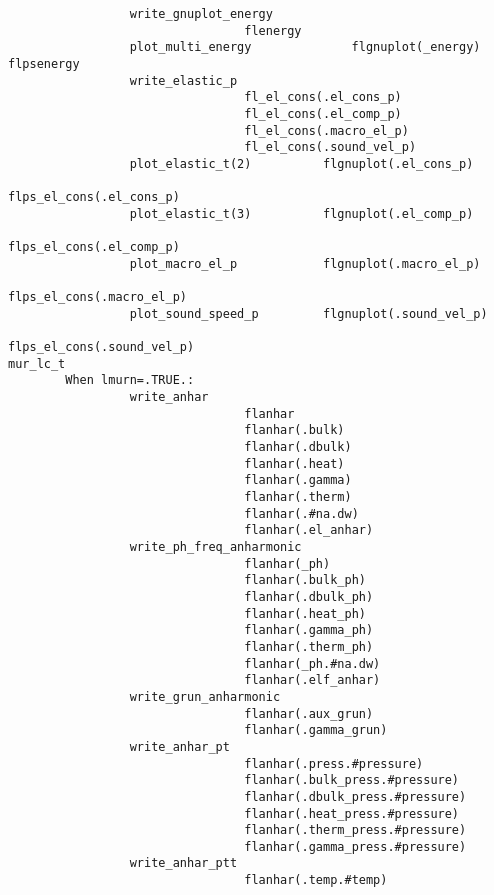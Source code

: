 \documentclass[12pt,a4paper,twoside]{report}
\begin{document}
\begin{footnotesize}
\begin{verbatim}
                 write_gnuplot_energy
                                 flenergy
                 plot_multi_energy              flgnuplot(_energy)  flpsenergy
                 write_elastic_p                
                                 fl_el_cons(.el_cons_p)              
                                 fl_el_cons(.el_comp_p)              
                                 fl_el_cons(.macro_el_p)              
                                 fl_el_cons(.sound_vel_p)              
                 plot_elastic_t(2)          flgnuplot(.el_cons_p)
                                                    flps_el_cons(.el_cons_p)
                 plot_elastic_t(3)          flgnuplot(.el_comp_p)
                                                    flps_el_cons(.el_comp_p)
                 plot_macro_el_p            flgnuplot(.macro_el_p)
                                                    flps_el_cons(.macro_el_p)
                 plot_sound_speed_p         flgnuplot(.sound_vel_p)
                                                    flps_el_cons(.sound_vel_p)
mur_lc_t        
        When lmurn=.TRUE.: 
                 write_anhar
                                 flanhar
                                 flanhar(.bulk)
                                 flanhar(.dbulk)
                                 flanhar(.heat)
                                 flanhar(.gamma)
                                 flanhar(.therm)
                                 flanhar(.#na.dw)
                                 flanhar(.el_anhar)
                 write_ph_freq_anharmonic
                                 flanhar(_ph)
                                 flanhar(.bulk_ph)
                                 flanhar(.dbulk_ph)
                                 flanhar(.heat_ph)
                                 flanhar(.gamma_ph)
                                 flanhar(.therm_ph)
                                 flanhar(_ph.#na.dw)
                                 flanhar(.elf_anhar)
                 write_grun_anharmonic
                                 flanhar(.aux_grun)
                                 flanhar(.gamma_grun)
                 write_anhar_pt
                                 flanhar(.press.#pressure)
                                 flanhar(.bulk_press.#pressure)
                                 flanhar(.dbulk_press.#pressure)
                                 flanhar(.heat_press.#pressure)
                                 flanhar(.therm_press.#pressure)
                                 flanhar(.gamma_press.#pressure)
                 write_anhar_ptt
                                 flanhar(.temp.#temp)

\end{verbatim}
\end{footnotesize}
\end{document}
